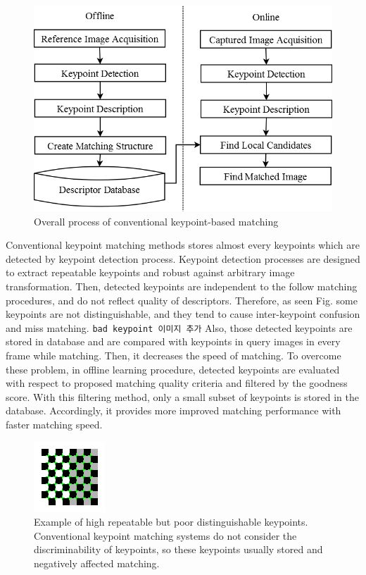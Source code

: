 \begin{figure}[hb!]
\centering
\includegraphics[width=1.0\columnwidth]{1_introduction/process}
\caption{Overall process of conventional keypoint-based matching}
\label{fig:on_offline_process}
\end{figure}

Conventional keypoint matching methods stores almost every keypoints which are detected by keypoint detection process. Keypoint detection processes are designed to extract repeatable keypoints and robust against arbitrary image transformation. Then, detected keypoints are independent to the follow matching procedures, and do not reflect quality of descriptors. Therefore, as seen Fig.  some keypoints are not distinguishable, and they tend to cause inter-keypoint confusion and miss matching. \texttt{bad keypoint 이미지 추가} Also, those detected keypoints are stored in database and are compared with keypoints in query images in every frame while matching. Then, it decreases the speed of matching. To overcome these problem, in offline learning procedure, detected keypoints are evaluated with respect to proposed matching quality criteria and filtered by the goodness score. With this filtering method, only a small subset of keypoints is stored in the database. Accordingly, it provides more improved matching performance with faster matching speed.

\begin{figure}[ht!]
\centering
\includegraphics[width=0.5\columnwidth]{1_introduction/checkerboard}
\caption{Example of high repeatable but poor distinguishable keypoints. Conventional keypoint matching systems do not consider the discriminability of keypoints, so these keypoints usually stored and negatively affected matching.}
\label{fig:example_of_bad_features}
\end{figure}